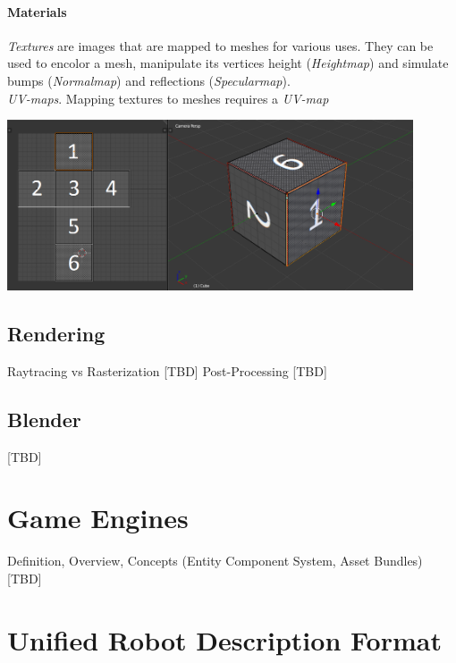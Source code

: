 \paragraph{Materials} \textit{Textures} are images that are mapped to meshes for various uses. They can be used to encolor a mesh, manipulate its vertices height (\textit{Heightmap})\cite{UnityDocHeightmap} and simulate bumps (\textit{Normalmap}\cite{UnityDocNormalmap}\cite{Cohen:1998:AS:280814.280832}\cite{745285}) and reflections (\textit{Specularmap})\cite{UnityDocSpecularmap}.\\
\textit{UV-maps}.
Mapping textures to meshes requires a \textit{UV-map}

\begin{center}
\noindent\includegraphics[width=12cm]{tex/img/ch03/CubeUVMapping.png}
\label{fig:3d-cube-uv-mapping}
\end{center}

\subsection{Rendering}
Raytracing \cite{Plemenos2010} vs Rasterization [TBD]
Post-Processing [TBD]


\subsection{Blender}
[TBD]

\section{Game Engines}
Definition, Overview, Concepts (Entity Component System, Asset Bundles) [TBD]

\section{Unified Robot Description Format}
